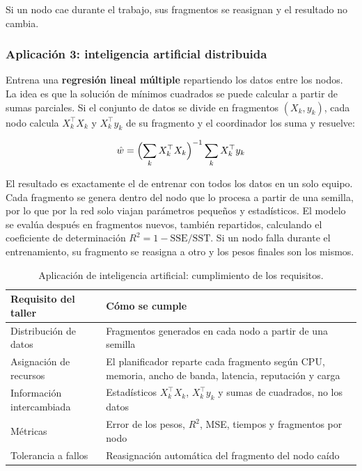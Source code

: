 Si un nodo cae durante el trabajo, sus fragmentos se reasignan y el resultado no cambia.

\subsubsection{Aplicación 3: inteligencia artificial distribuida}

Entrena una \textbf{regresión lineal múltiple} repartiendo los datos entre los nodos. La idea es que
la solución de mínimos cuadrados se puede calcular a partir de sumas parciales. Si el conjunto de
datos se divide en fragmentos $(X_k, y_k)$, cada nodo calcula $X_k^{\top}X_k$ y $X_k^{\top}y_k$ de su
fragmento y el coordinador los suma y resuelve:

\begin{equation}
\hat{w} = \Bigl(\sum_k X_k^{\top}X_k\Bigr)^{-1} \sum_k X_k^{\top}y_k
\end{equation}

El resultado es exactamente el de entrenar con todos los datos en un solo equipo. Cada fragmento se
genera dentro del nodo que lo procesa a partir de una semilla, por lo que por la red solo viajan
parámetros pequeños y estadísticos. El modelo se evalúa después en fragmentos nuevos, también
repartidos, calculando el coeficiente de determinación
$R^2 = 1 - \mathrm{SSE}/\mathrm{SST}$. Si un nodo falla durante el entrenamiento, su fragmento se
reasigna a otro y los pesos finales son los mismos.

\begin{table}[htbp]
\centering
\small
\begin{tabular}{|p{}|p{}|}
\hline
\textbf{Requisito del taller} & \textbf{Cómo se cumple} \\ \hline
Distribución de datos & Fragmentos generados en cada nodo a partir de una semilla \\ \hline
Asignación de recursos & El planificador reparte cada fragmento según CPU, memoria, ancho de banda, latencia, reputación y carga \\ \hline
Información intercambiada & Estadísticos $X_k^{\top}X_k$, $X_k^{\top}y_k$ y sumas de cuadrados, no los datos \\ \hline
Métricas & Error de los pesos, $R^2$, MSE, tiempos y fragmentos por nodo \\ \hline
Tolerancia a fallos & Reasignación automática del fragmento del nodo caído \\ \hline
\end{tabular}
\caption{Aplicación de inteligencia artificial: cumplimiento de los requisitos.}
\label{tab:ia}
\end{table}

